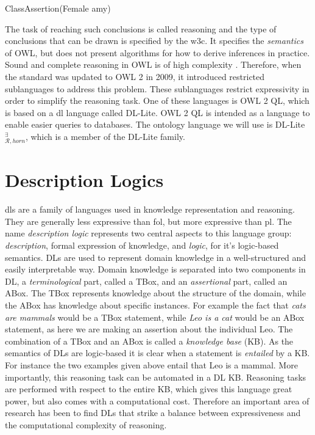 \centerline{\textsf{ClassAssertion(Female amy)}}
The task of reaching such conclusions is called reasoning and the type of conclusions that can be drawn is specified by the \gls{w3c}. It specifies the \emph{semantics} of OWL, but does not present algorithms for how to derive inferences in practice. Sound and complete reasoning in OWL is of high complexity \cite{Krotzsch2012}. Therefore, when the standard was updated to OWL 2 in 2009, it introduced restricted sublanguages to address this problem. These sublanguages restrict expressivity in order to simplify the reasoning task. One of these languages is OWL 2 QL, which is based on a \gls{dl} language called DL-Lite. OWL 2 QL is intended as a language to enable easier queries to databases. The ontology language we will use is DL-Lite$_{\mathcal{R}, horn}^{\exists}$, which is a member of the DL-Lite family.



\section{Description Logics}
\gls{dls} are a family of languages used in knowledge representation and reasoning. They are generally less expressive than \gls{fol}, but more expressive than \gls{pl}. The name \textit{description logic} represents two central aspects to this language group: \emph{description}, formal expression of knowledge, and  \emph{logic}, for it's logic-based semantics. DLs are used to represent domain knowledge in a well-structured and easily interpretable way. Domain knowledge is separated into two components in DL, a \emph{terminological} part, called a TBox, and an \emph{assertional} part, called an ABox. The TBox represents knowledge about the structure of the domain, while the ABox has knowledge about specific instances. For example the fact that \emph{cats are  mammals} would be a TBox statement, while \emph{Leo is a cat} would be an ABox statement, as here we are making an assertion about the individual Leo. The combination of a TBox and an ABox is called a \emph{knowledge base} (KB).
As the semantics of DLs are logic-based it is clear when a statement is \emph{entailed} by a KB. For instance the two examples given above entail that Leo is a mammal. More importantly, this reasoning task can be automated in a DL KB. Reasoning tasks are performed with respect to the entire KB, which gives this language great power, but also comes with a computational cost. Therefore an important area of research has been to find DLs that strike a balance between expressiveness and the computational complexity of reasoning.


